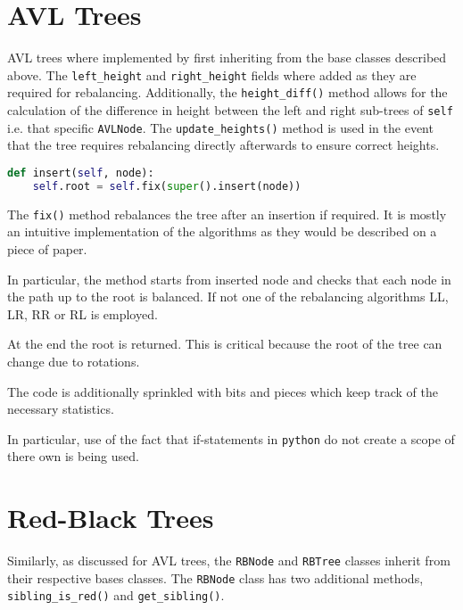 \documentclass[article]{uom-coursework}
\begin{document}
\section{AVL Trees}

AVL trees where implemented by first inheriting from the base
classes described above. The \texttt{left\_height} and
\texttt{right\_height} fields where added as they are required
for rebalancing. Additionally, the \texttt{height\_diff()}
method allows for the calculation of the difference in height
between the left and right sub-trees of \texttt{self} i.e. that
specific \texttt{AVLNode}. The \texttt{update\_heights()} method
is used in the event that the tree requires rebalancing directly
afterwards to ensure correct heights.

\begin{lstlisting}[caption={The main insert function for AVL trees},language=Python]
def insert(self, node):
    self.root = self.fix(super().insert(node))
\end{lstlisting}

The \texttt{fix()} method rebalances the tree after an insertion
if required. It is mostly an intuitive implementation of the
algorithms as they would be described on a piece of paper.

In particular, the method starts from inserted node and checks
that each node in the path up to the root is balanced.  If not
one of the rebalancing algorithms LL, LR, RR or RL is employed.

\begin{note}
At the end the root is returned. This is critical
because the root of the tree can change due to rotations.
\end{note}

The code is additionally sprinkled with bits and pieces which
keep track of the necessary statistics.

In particular, use of the fact that if-statements in
\texttt{python} do not create a scope of there own is being
used.

\section{Red-Black Trees}

Similarly, as discussed for AVL trees, the \texttt{RBNode} and
\texttt{RBTree} classes inherit from their respective bases
classes. The \texttt{RBNode} class has two additional methods,
\texttt{sibling\_is\_red()} and \texttt{get\_sibling()}.
\end{document}
